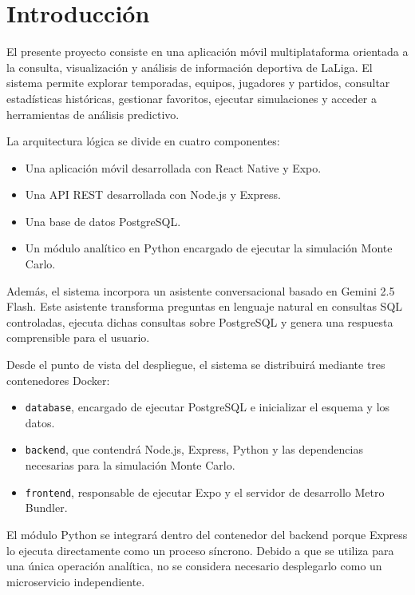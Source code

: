 \section{Introducci\'on}

El presente proyecto consiste en una aplicaci\'on m\'ovil multiplataforma orientada
a la consulta, visualizaci\'on y an\'alisis de informaci\'on deportiva de LaLiga. El
sistema permite explorar temporadas, equipos, jugadores y partidos, consultar
estad\'isticas hist\'oricas, gestionar favoritos, ejecutar simulaciones y acceder a
herramientas de an\'alisis predictivo.

La arquitectura l\'ogica se divide en cuatro componentes:

\begin{itemize}
  \item Una aplicaci\'on m\'ovil desarrollada con React Native y Expo.
  \item Una API REST desarrollada con Node.js y Express.
  \item Una base de datos PostgreSQL.
  \item Un m\'odulo anal\'itico en Python encargado de ejecutar la simulaci\'on
        Monte Carlo.
\end{itemize}

Adem\'as, el sistema incorpora un asistente conversacional basado en Gemini 2.5
Flash. Este asistente transforma preguntas en lenguaje natural en consultas SQL
controladas, ejecuta dichas consultas sobre PostgreSQL y genera una respuesta
comprensible para el usuario.

Desde el punto de vista del despliegue, el sistema se distribuir\'a mediante tres
contenedores Docker:

\begin{itemize}
  \item \texttt{database}, encargado de ejecutar PostgreSQL e inicializar el
        esquema y los datos.
  \item \texttt{backend}, que contendr\'a Node.js, Express, Python y las
        dependencias necesarias para la simulaci\'on Monte Carlo.
  \item \texttt{frontend}, responsable de ejecutar Expo y el servidor de
        desarrollo Metro Bundler.
\end{itemize}

El m\'odulo Python se integrar\'a dentro del contenedor del backend porque Express
lo ejecuta directamente como un proceso s\'incrono. Debido a que se utiliza para
una \'unica operaci\'on anal\'itica, no se considera necesario desplegarlo como un
microservicio independiente.


